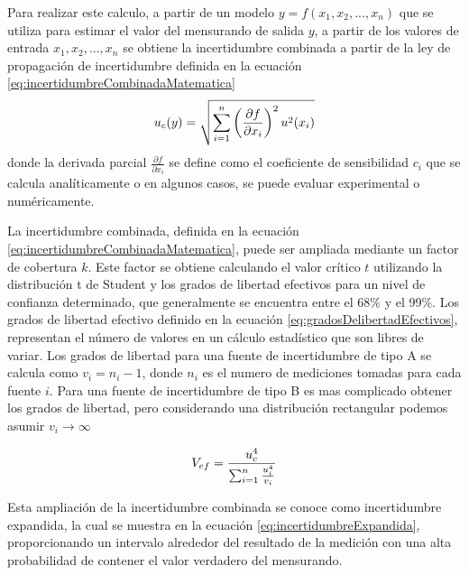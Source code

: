 Para realizar este calculo, a partir de un modelo $y = f(x_{1},x_{2}, ..., x_{n})$ que se utiliza para estimar el valor del mensurando de salida $y$, a partir de los valores de entrada $x_{1},x_{2}, ..., x_{n}$ se obtiene la incertidumbre combinada a partir de la ley de propagación de incertidumbre definida en la ecuación \ref{eq:incertidumbreCombinadaMatematica}
\begin{equation}
    \centering
    u_{c}(y) = \sqrt{\sum_{i=1}^{n} \left( \frac{\partial f}{\partial x_{i}} \right)^2 u^2(x_i)}
    \label{eq:incertidumbreCombinadaMatematica}
\end{equation}
donde la derivada parcial $\frac{\partial f}{\partial x_{i}}$ se define como el coeficiente de sensibilidad $c_{i}$ que se calcula analíticamente o en algunos casos, se puede evaluar experimental o numéricamente.

La incertidumbre combinada, definida en la ecuación \ref{eq:incertidumbreCombinadaMatematica}, puede ser ampliada mediante un factor de cobertura $k$. Este factor se obtiene calculando el valor crítico $t$ utilizando la distribución t de Student y los grados de libertad efectivos para un nivel de confianza determinado, que generalmente se encuentra entre el 68\% y el 99\%. Los grados de libertad efectivo definido en la ecuación \ref{eq:gradosDelibertadEfectivos}, representan el número de valores en un cálculo estadístico que son libres de variar. Los grados de libertad para una fuente de incertidumbre de tipo A se calcula como  $v_{i}= n_{i}-1$, donde $n_{i}$ es el numero de mediciones tomadas para cada fuente $i$. Para una fuente de incertidumbre de tipo B es mas complicado obtener los grados de libertad, pero considerando una distribución rectangular podemos asumir $v_{i} \rightarrow \infty$ \cite{Workshop_WMO2021}


\begin{equation}
    \centering
    V_{ef} = \frac{u_c^4}{\sum_{i=1}^{n} \frac{u_i^4}{v_i}}
    \label{eq:gradosDelibertadEfectivos}
\end{equation}


Esta ampliación de la incertidumbre combinada se conoce como incertidumbre expandida, la cual se muestra en la ecuación \ref{eq:incertidumbreExpandida}, proporcionando un intervalo alrededor del resultado de la medición con una alta probabilidad de contener el valor verdadero del mensurando.


